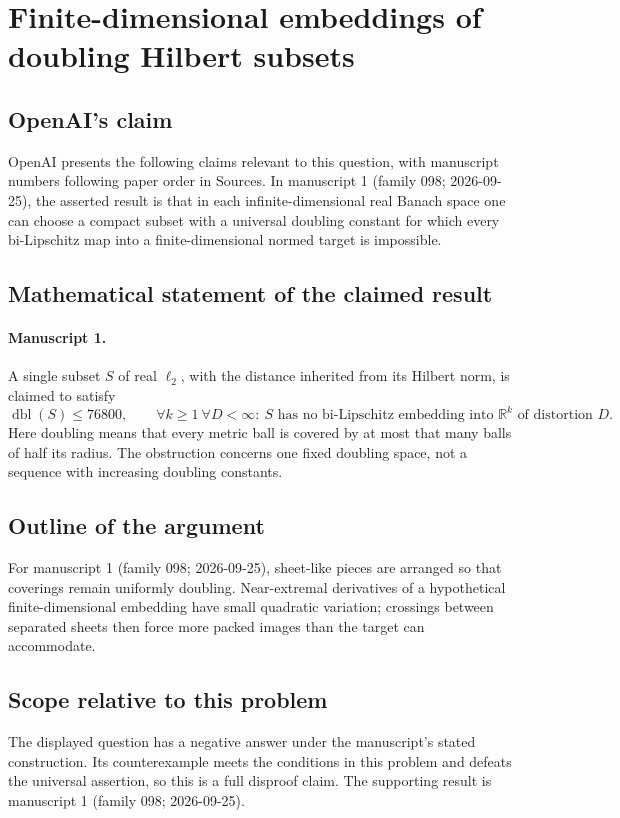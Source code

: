\documentclass[11pt]{article}
\begin{document}
\section*{Finite-dimensional embeddings of doubling Hilbert subsets}

\subsection{OpenAI's claim}
OpenAI presents the following claims relevant to this question, with manuscript numbers following paper order in Sources. In manuscript 1 (family 098; 2026-09-25), the asserted result is that in each infinite-dimensional real Banach space one can choose a compact subset with a universal doubling constant for which every bi-Lipschitz map into a finite-dimensional normed target is impossible.

\subsection{Mathematical statement of the claimed result}
\paragraph{Manuscript 1.}
A single subset $S$ of real $\ell_2$, with the distance inherited from its Hilbert norm, is claimed to satisfy
\[
 \operatorname{dbl}(S)\le76800,\qquad
 \forall k\ge1\ \forall D<\infty:\ S\text{ has no bi-Lipschitz embedding into }\mathbb R^k\text{ of distortion }D.
\]
Here doubling means that every metric ball is covered by at most that many balls of half its radius. The obstruction concerns one fixed doubling space, not a sequence with increasing doubling constants.

\subsection{Outline of the argument}
For manuscript 1 (family 098; 2026-09-25), sheet-like pieces are arranged so that coverings remain uniformly doubling. Near-extremal derivatives of a hypothetical finite-dimensional embedding have small quadratic variation; crossings between separated sheets then force more packed images than the target can accommodate.

\subsection{Scope relative to this problem}
The displayed question has a negative answer under the manuscript's stated construction. Its counterexample meets the conditions in this problem and defeats the universal assertion, so this is a full disproof claim. The supporting result is manuscript 1 (family 098; 2026-09-25).
\end{document}
